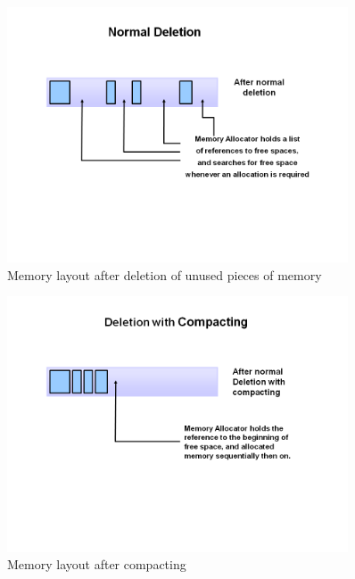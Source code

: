 \begin{figure}[htb]
    \centering
    \includegraphics[width=0.9\textwidth]{figures/fundamentals_garbage_collector_deletion.PNG}
    \caption[Illustration: Garbage Collector deleting marked memory\\Source: https://www.oracle.com/webfolder/technetwork/tutorials/obe/java/gc01/images/gcslides/Slide1b.png]{Memory layout after deletion of unused pieces of memory}
    \label{fig:gc_delete}
\end{figure}

\begin{figure}[htb]
    \centering
    \includegraphics[width=0.9\textwidth]{figures/fundamentals_garbage_collector_compacting.PNG}
    \caption[Illustration: Garbage Collector compacting memory\\Source: https://www.oracle.com/webfolder/technetwork/tutorials/obe/java/gc01/images/gcslides/Slide4.png]{Memory layout after compacting}
    \label{fig:gc_compact}
\end{figure}

